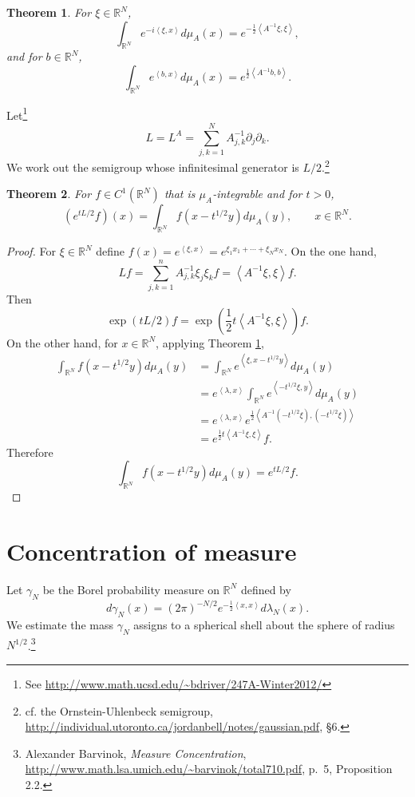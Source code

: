 \documentclass{article}
\newcommand{\inner}[2]{\left\langle #1, #2 \right\rangle}
\newtheorem{theorem}{Theorem}
\theoremstyle{definition}
\begin{document}
\begin{theorem}
For $\xi \in \mathbb{R}^N$,
\[
\int_{\mathbb{R}^N} e^{-i\inner{\xi}{x}} d\mu_A(x) = e^{-\frac{1}{2}\inner{A^{-1}\xi}{\xi}},
\]
and for $b \in \mathbb{R}^N$,
\[
\int_{\mathbb{R}^N} e^{\inner{b}{x}} d\mu_A(x) = e^{\frac{1}{2}\inner{A^{-1}b}{b}}.
\]
\label{gaussianRd}
\end{theorem}


Let\footnote{See \url{http://www.math.ucsd.edu/~bdriver/247A-Winter2012/}}
\[
L=L^A = \sum_{j,k=1}^N A_{j,k}^{-1} \partial_j \partial_k.
\]
We work out the semigroup whose infinitesimal generator is $L/2$.\footnote{cf. the Ornstein-Uhlenbeck semigroup,
\url{http://individual.utoronto.ca/jordanbell/notes/gaussian.pdf}, \S 6.}

\begin{theorem}
For $f \in C^1(\mathbb{R}^N)$ that is $\mu_A$-integrable and for $t>0$,
\[
(e^{t L/2} f)(x) = \int_{\mathbb{R}^N} f(x-t^{1/2} y) d\mu_A(y),
\qquad x \in \mathbb{R}^N.
\]
\end{theorem}
\begin{proof}
For $\xi \in \mathbb{R}^N$ define
 $f(x) = e^{\inner{\xi}{x}}=e^{\xi_1 x_1 + \cdots + \xi_N x_N}$. On the one hand,
\[
Lf=\sum_{j,k=1}^n A_{j,k}^{-1} \xi_j \xi_k f
= \inner{A^{-1}\xi}{\xi} f.
\]
Then
\[
\exp(tL/2) f = \exp\left( \frac{1}{2}t \inner{A^{-1}\xi}{\xi} \right) f.
\]
On the other hand, for $x \in \mathbb{R}^N$, applying Theorem \ref{gaussianRd},
\begin{align*}
\int_{\mathbb{R}^N} f(x-t^{1/2}y) d\mu_A(y)&=\int_{\mathbb{R}^N}
e^{\inner{\xi}{x-t^{1/2}y}} d\mu_A(y)\\
&=e^{\inner{\lambda}{x}} \int_{\mathbb{R}^N} e^{\inner{-t^{1/2}\xi}{y}} d\mu_A(y)\\
&=e^{\inner{\lambda}{x}} e^{\frac{1}{2}\inner{A^{-1} (-t^{1/2} \xi)}{(-t^{1/2}\xi)}}\\
&= e^{\frac{1}{2}t\inner{A^{-1}\xi}{\xi}} f.
\end{align*}
Therefore
\[
\int_{\mathbb{R}^N} f(x-t^{1/2}y) d\mu_A(y) = e^{tL/2} f.
\]
\end{proof}



\section{Concentration of measure}
Let $\gamma_N$ be the Borel probability measure on $\mathbb{R}^N$ defined by
\[
d\gamma_N(x) = (2\pi)^{-N/2} e^{-\frac{1}{2} \inner{x}{x}} d\lambda_N(x).
\]
We estimate the mass $\gamma_N$ assigns to a spherical shell about the sphere of radius $N^{1/2}$.\footnote{Alexander
Barvinok, {\em Measure Concentration}, \url{http://www.math.lsa.umich.edu/~barvinok/total710.pdf},
p.~5, Proposition 2.2.}
\end{document}
